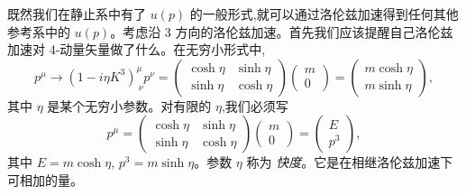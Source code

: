 既然我们在静止系中有了 $u(p)$ 的一般形式,就可以通过洛伦兹加速得到任何其他参考系中的 $u(p)$。考虑沿 3 方向的洛伦兹加速。首先我们应该提醒自己洛伦兹加速对 4-动量矢量做了什么。在无穷小形式中,
\begin{equation}
  p^\mu \to (1 - i\eta K^3)^{\mu}_{\ \nu}p^\nu
    = \begin{pmatrix}
        \cosh\eta & \sinh\eta\\
        \sinh\eta & \cosh\eta
      \end{pmatrix}
      \begin{pmatrix}m\\ 0\end{pmatrix}
    = \begin{pmatrix}m\cosh\eta\\ m\sinh\eta\end{pmatrix},
\end{equation}
其中 $\eta$ 是某个无穷小参数。对有限的 $\eta$,我们必须写
\begin{equation}
  p^\mu = \begin{pmatrix}
    \cosh\eta & \sinh\eta\\
    \sinh\eta & \cosh\eta
  \end{pmatrix}
  \begin{pmatrix}m\\ 0\end{pmatrix}
  = \begin{pmatrix}
    E\\ p^3
  \end{pmatrix},
  \label{eq:3.50}
\end{equation}
其中 $E = m\cosh\eta$, $p^3 = m\sinh\eta$。参数 $\eta$ 称为 \emph{快度}。它是在相继洛伦兹加速下可相加的量。

